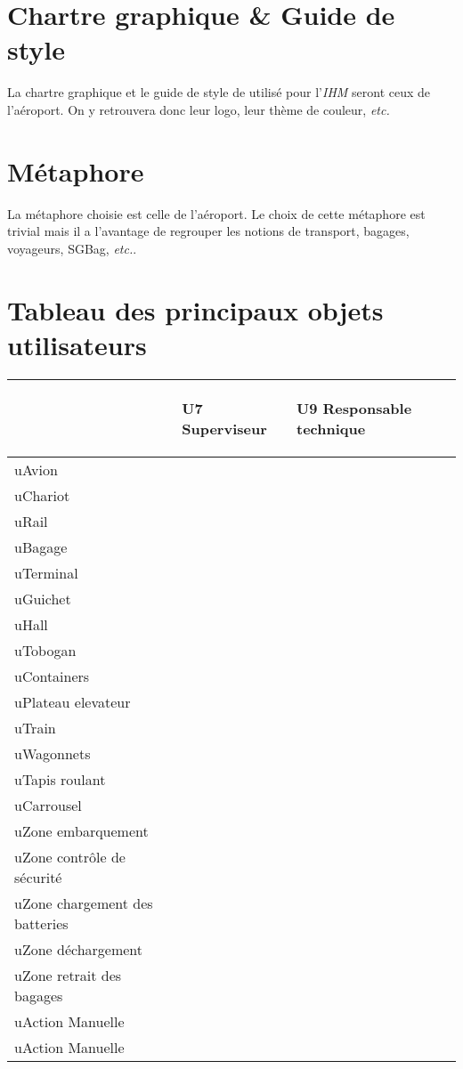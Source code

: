 \section{Chartre graphique \& Guide de style}
La chartre graphique et le guide de style de utilisé pour l'\textsl{IHM} seront ceux de l'aéroport. On y retrouvera donc leur logo, leur thème de couleur, \textsl{etc.}

\section{Métaphore}
La métaphore choisie est celle de \og l'aéroport\fg. Le choix de cette métaphore est trivial mais il a l'avantage de regrouper les notions de \og transport, bagages, voyageurs, SGBag, \textsl{etc.}\fg.

\section{Tableau des principaux objets utilisateurs}
\providecommand{\DJSPU}[1]{}

\begin {tabular} {| l | l | l |}
\hline
~
&\begin{sideways}U7 Superviseur\end{sideways}
&\begin{sideways}U9 Responsable technique~\end{sideways}\\
\hline
uAvion  & & \\
\hline
uChariot  & & \\
\hline
uRail & & \\
\hline
uBagage  & & \\
\hline
uTerminal  & & \\
\hline
uGuichet  & & \\
\hline
uHall  & & \\
\hline
uTobogan  & & \\
\hline
uContainers  & & \\
\hline
uPlateau elevateur  & & \\
\hline
uTrain  & & \\
\hline
uWagonnets  & & \\
\hline
uTapis roulant  & & \\
\hline
uCarrousel  & & \\
\hline
uZone embarquement  & & \\
\hline
uZone contrôle de sécurité  & & \\
\hline
uZone chargement des batteries  & & \\
\hline
uZone déchargement  & & \\
\hline
uZone retrait des bagages  & & \\
\hline
uAction Manuelle & & \\
\hline
uAction Manuelle & & \\
\hline
\end {tabular}
